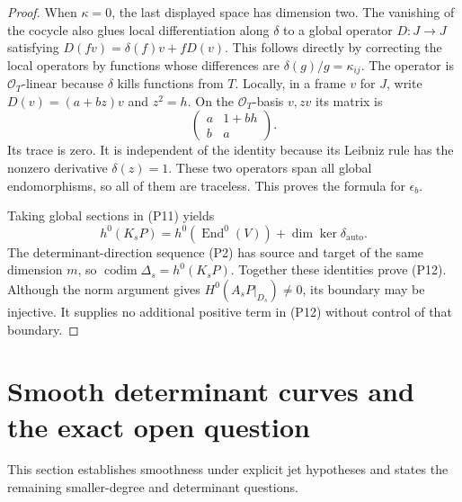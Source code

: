 \documentclass[11pt]{article}
\theoremstyle{definition}\newtheorem{definition}[theorem]{Definition}
\theoremstyle{remark}\newtheorem{remark}[theorem]{Remark}
\newcommand{\OO}{\mathcal O}
\newcommand{\End}{\operatorname{End}}
\begin{document}
\begin{proof}
When $\kappa=0$, the last displayed space has dimension two. The vanishing
of the cocycle also glues local differentiation along $\delta$ to a global
operator $D:J\to J$ satisfying
$D(fv)=\delta(f)v+fD(v)$. This follows directly by correcting the local
operators by functions whose differences are $\delta(g)/g=\kappa_{ij}$.
The operator is $\OO_T$-linear because $\delta$ kills functions from $T$.
Locally, in a frame $v$ for $J$, write $D(v)=(a+bz)v$ and $z^2=h$.
On the $\OO_T$-basis $v,zv$ its matrix is
\[
                 \begin{pmatrix}a&1+bh\\b&a\end{pmatrix}.
\]
Its trace is zero. It is independent of the identity because its Leibniz
rule has the nonzero derivative $\delta(z)=1$. These two operators span
all global endomorphisms, so all of them are traceless. This proves the
formula for $\epsilon_b$.

Taking global sections in (P11) yields
\[
 h^0(K_sP)=h^0(\End^0(V))+\dim\ker\delta_{\mathrm{auto}}.
\]
The determinant-direction sequence (P2) has source and target of the same
dimension $m$, so $\operatorname{codim}\Delta_s=h^0(K_sP)$.
Together these identities prove (P12). Although the norm argument gives
$H^0(A_sP|_{D_s})\ne0$, its boundary may be injective. It supplies no
additional positive term in (P12) without control of that boundary.
\end{proof}

\section{Smooth determinant curves and the exact open question}
\label{sec:open}

This section establishes smoothness under explicit jet hypotheses and states the remaining smaller-degree and determinant questions.
\end{document}
